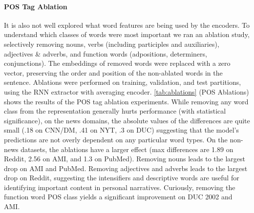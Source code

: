  
\paragraph{POS Tag Ablation}
It is also not well explored what word features are being used by the encoders.
To understand which classes of words were most important we ran an ablation
study, selectively removing nouns, verbs 
(including participles and auxiliaries), adjectives \& adverbs, and 
function words (adpositions, determiners, conjunctions).
The embeddings of removed words were replaced with a zero vector,
preserving the order and position of the non-ablated words in the sentence.
Ablations were performed on training, validation, and test partitions,
using the RNN extractor with averaging encoder.
\autoref{tab:ablations} (POS Ablations) shows the results of the POS
tag ablation experiments. 
While removing any word class from the representation generally hurts 
performance (with statistical significance), on the news domains,
the absolute values of the differences are quite small 
(.18 on CNN/DM, .41 on NYT, .3 on DUC) suggesting that the model's predictions
are not overly dependent on any particular word types.
On the non-news datasets, the ablations have a larger effect 
(max differences are 1.89 on Reddit, 2.56 on AMI, and 1.3 on PubMed).
Removing nouns leads to the largest drop on AMI and PubMed.
Removing adjectives and adverbs leads to the largest drop on Reddit,
suggesting the intensifiers and descriptive words are useful for 
identifying important content in personal narratives.
Curiously, 
removing the function word POS class yields a significant improvement
on DUC 2002 and AMI.


